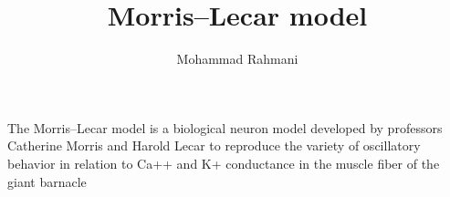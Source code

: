 \documentclass[a4paper]{article}
\title{Morris–Lecar model}
\date{}
\author{Mohammad Rahmani}
\begin{document}
    \maketitle
    The Morris–Lecar model is a biological neuron model developed by professors Catherine Morris and Harold Lecar to reproduce the variety of oscillatory behavior in relation to Ca++ and K+ conductance in the muscle fiber of the giant barnacle 
    
    
\end{document}
